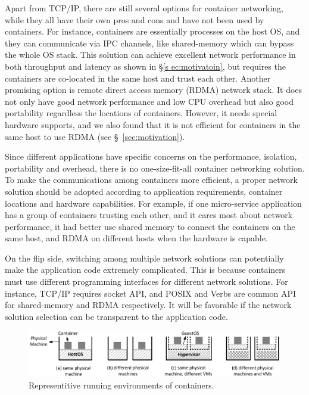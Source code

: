 Apart from TCP/IP, there are still several options for container networking,
while they all have their own pros and cons and have not been used by containers.
For instance, containers are essentially processes on the host OS, and they can 
communicate via IPC channels, like shared-memory which can bypass the whole OS 
stack. This solution can achieve
excellent network performance in both throughput and latency as shown in \S\ref{s
ec:motivatoin}, but requires the containers are co-located in the same host and 
trust each other. Another promising option is remote direct access memory (RDMA) network stack. It does not only have good network performance and low CPU overhead but also good portability regardless the locations of containers. 
However, it needs special hardware supports, and we also found that it is not efficient for containers in the same host to use RDMA
(see \S~\ref{sec:motivation}). 

Since different applications have specific concerns on the performance, 
isolation, portability and overhead, there is no
one-size-fit-all container networking solution. To make the communications among
containers more efficient, a proper network solution should be adopted according
to application requirements, container locations and hardware capabilities.
For example, if one micro-service application has a group of containers trusting each other, and it cares most about network performance, it had better use
shared memory to connect the containers on the same host, and RDMA on different hosts when the hardware is capable. 

On the flip side, switching among multiple network solutions can potentially 
make the application code extremely complicated. This is because
containers must use different programming interfaces for different
network solutions. For instance, TCP/IP requires socket API, and POSIX and Verbs
are common API for shared-memory and RDMA respectively. 
It will be favorable if the network solution selection can be transparent to the application code.

\begin{figure}[!ht]
     \centering 
     \includegraphics[width=6.7in]{figures/deployment-cases} 
    \caption{\label{fig:deploy-cases} Representitive running environments of containers.} 
\end{figure} 

